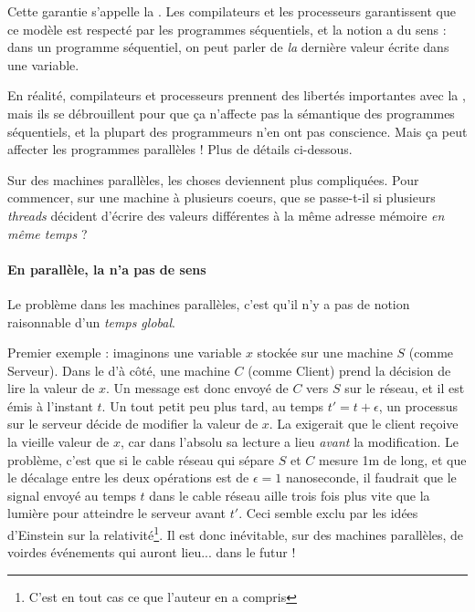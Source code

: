 Cette garantie s'appelle la \og {}\fg. Les compilateurs et les
processeurs garantissent que ce modèle est respecté par les programmes
séquentiels, et la notion a du sens : dans un programme séquentiel, on
peut parler de \emph{la} dernière valeur écrite dans une variable.

\begin{danger}
  En réalité, compilateurs et processeurs prennent des libertés
  importantes avec la , mais ils se débrouillent
  pour que ça n'affecte pas la sémantique des programmes séquentiels, et la
  plupart des programmeurs n'en ont pas conscience. Mais ça peut affecter les
  programmes parallèles ! Plus de détails ci-dessous.
\end{danger}

Sur des machines parallèles, les choses deviennent plus compliquées. Pour
commencer, sur une machine à plusieurs coeurs, que se passe-t-il si plusieurs
\emph{threads} décident d'écrire des valeurs différentes à la même adresse
mémoire \emph{en même temps} ?

\paragraph{En parallèle, la  n'a pas de sens} Le
problème dans les machines parallèles, c'est qu'il n'y a pas de notion
raisonnable d'un \emph{temps global}.

Premier exemple : imaginons une variable $x$ stockée sur une machine $S$ (comme
Serveur). Dans le  d'à côté, une machine $C$ (comme Client) prend
la décision de lire la valeur de $x$. Un message est donc envoyé de $C$ vers $S$
sur le réseau, et il est émis à l'instant $t$. Un tout petit peu plus tard, au
temps $t' = t + \epsilon$, un processus sur le serveur décide de modifier la
valeur de $x$. La  exigerait que le client reçoive
la vieille valeur de $x$, car dans l'absolu sa lecture a lieu \emph{avant} la
modification. Le problème, c'est que si le cable réseau qui sépare $S$ et $C$
mesure 1m de long, et que le décalage entre les deux opérations est de
$\epsilon = 1$ nanoseconde, il faudrait que le signal envoyé au temps $t$ dans
le cable réseau aille trois fois plus vite que la lumière pour atteindre le
serveur avant $t'$. Ceci semble exclu par les idées d'Einstein sur la
relativité\footnote{C'est en tout cas ce que l'auteur en a compris}. Il est donc
inévitable, sur des machines parallèles, de \og voir\fg des événements qui
auront lieu... dans le futur !


